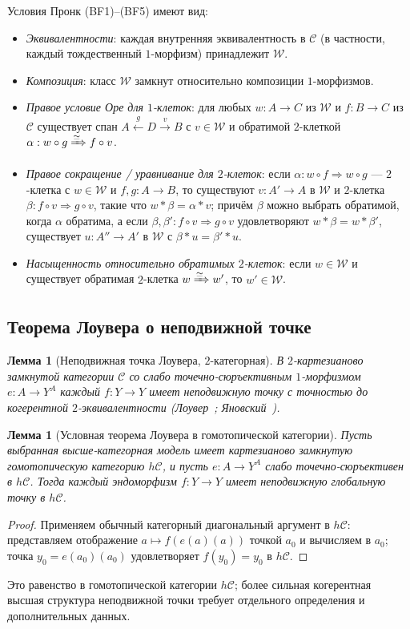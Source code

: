 \documentclass[11pt]{article}
\theoremstyle{plain}
\newtheorem{lemma}[theorem]{Лемма}
\theoremstyle{definition}
\newcommand{\cC}{\mathcal{C}}
\begin{document}
Условия Пронк (BF1)--(BF5) имеют вид:
\begin{itemize}
\item[\textbf{(BF1)}] \emph{Эквивалентности}: каждая внутренняя эквивалентность в $\cC$ (в частности, каждый тождественный $1$-морфизм) принадлежит $\mathcal{W}$.
\item[\textbf{(BF2)}] \emph{Композиция}: класс $\mathcal{W}$ замкнут относительно композиции $1$-морфизмов.
\item[\textbf{(BF3)}] \emph{Правое условие Оре для $1$-клеток}: для любых $w : A \to C$ из $\mathcal{W}$ и $f : B \to C$ из $\cC$ существует спан $A \xleftarrow{g} D \xrightarrow{v} B$ с $v \in \mathcal{W}$ и обратимой $2$-клеткой $\alpha : w \circ g \xRightarrow{\simeq} f \circ v$.
\item[\textbf{(BF4)}] \emph{Правое сокращение / уравнивание для $2$-клеток}: если $\alpha : w \circ f \Rightarrow w \circ g$ — $2$-клетка с $w \in \mathcal{W}$ и $f, g : A \to B$, то существуют $v : A' \to A$ в $\mathcal{W}$ и $2$-клетка $\beta : f \circ v \Rightarrow g \circ v$, такие что $w \ast \beta = \alpha \ast v$; причём $\beta$ можно выбрать обратимой, когда $\alpha$ обратима, а если $\beta, \beta' : f \circ v \Rightarrow g \circ v$ удовлетворяют $w \ast \beta = w \ast \beta'$, существует $u : A'' \to A'$ в $\mathcal{W}$ с $\beta \ast u = \beta' \ast u$.
\item[\textbf{(BF5)}] \emph{Насыщенность относительно обратимых $2$-клеток}: если $w \in \mathcal{W}$ и существует обратимая $2$-клетка $w \xRightarrow{\simeq} w'$, то $w' \in \mathcal{W}$.
\end{itemize}

\subsection{Теорема Лоувера о неподвижной точке}

\begin{lemma}[Неподвижная точка Лоувера, $2$-категорная]\label{lem:lawvere-2}
В $2$-картезианово замкнутой категории $\cC$ со слабо точечно-сюръективным $1$-морфизмом $e : A \to Y^A$ каждый $f : Y \to Y$ имеет неподвижную точку с точностью до когерентной $2$-эквивалентности (Лоувер~\cite{Lawvere1969}; Яновский~\cite{Yanofsky2003}).
\end{lemma}

\begin{lemma}[Условная теорема Лоувера в гомотопической категории]\label{lem:lawvere-inf}
Пусть выбранная высше-категорная модель имеет картезианово замкнутую гомотопическую категорию $h\cC$, и пусть $e : A \to Y^A$ слабо точечно-сюръективен в $h\cC$. Тогда каждый эндоморфизм $f : Y \to Y$ имеет неподвижную глобальную точку в $h\cC$.
\end{lemma}
\begin{proof}
Применяем обычный категорный диагональный аргумент в $h\cC$: представляем отображение $a \mapsto f(e(a)(a))$ точкой $a_0$ и вычисляем в $a_0$; точка $y_0 = e(a_0)(a_0)$ удовлетворяет $f(y_0) = y_0$ в $h\cC$.
\end{proof}
Это равенство в гомотопической категории $h\cC$; более сильная когерентная высшая структура неподвижной точки требует отдельного определения и дополнительных данных.
\end{document}
